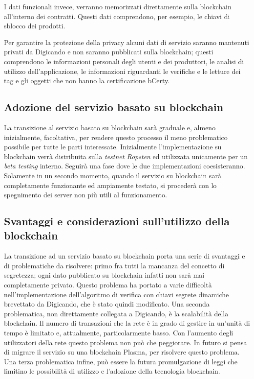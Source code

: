 I dati funzionali invece, verranno memorizzati direttamente sulla blockchain all'interno dei contratti. Questi dati comprendono, per esempio, le chiavi di sblocco dei prodotti.

Per garantire la protezione della privacy alcuni dati di servizio saranno mantenuti privati da Digicando e non saranno pubblicati sulla blockchain; questi comprendono le informazioni personali degli utenti e dei produttori, le analisi di utilizzo dell'applicazione, le informazioni riguardanti le verifiche e le letture dei tag e gli oggetti che non hanno la certificazione bCerty.

\subsection{Adozione del servizio basato su blockchain}
\label{adozione-del-servizio-basato-su-blockchain}
La transizione al servizio basato su blockchain sarà graduale e, almeno inizialmente, facoltativa, per rendere questo processo il meno problematico possibile per tutte le parti interessate. Inizialmente l'implementazione su blockchain verrà distribuita sulla \emph{testnet Ropsten} ed utilizzata unicamente per un \emph{beta testing} interno. Seguirà una fase dove le due implementazioni coesisteranno. Solamente in un secondo momento, quando il servizio su blockchain sarà completamente funzionante ed ampiamente testato, si procederà con lo spegnimento dei server non più utili al funzionamento.

\subsection{Svantaggi e considerazioni sull'utilizzo della blockchain}
\label{svantaggi-e-considerazioni}
La transizione ad un servizio basato su blockchain porta una serie di svantaggi e di problematiche da risolvere: primo fra tutti la mancanza del concetto di segretezza; ogni dato pubblicato su blockchain infatti non sarà mai completamente privato. Questo problema ha portato a varie difficoltà nell'implementazione dell'algoritmo di verifica con chiavi segrete dinamiche brevettato da Digicando, che è stato quindi modificato. Una seconda problematica, non direttamente collegata a Digicando, è la scalabilità della blockchain. Il numero di transazioni che la rete è in grado di gestire in un'unità di tempo è limitato e, attualmente, particolarmente basso. Con l'aumento degli utilizzatori della rete questo problema non può che peggiorare. In futuro si pensa di migrare il servizio su una blockchain Plasma, per risolvere questo problema. Una terza problematica infine, può essere la futura promulgazione di leggi che limitino le possibilità di utilizzo e l'adozione della tecnologia blockchain.

\newpage